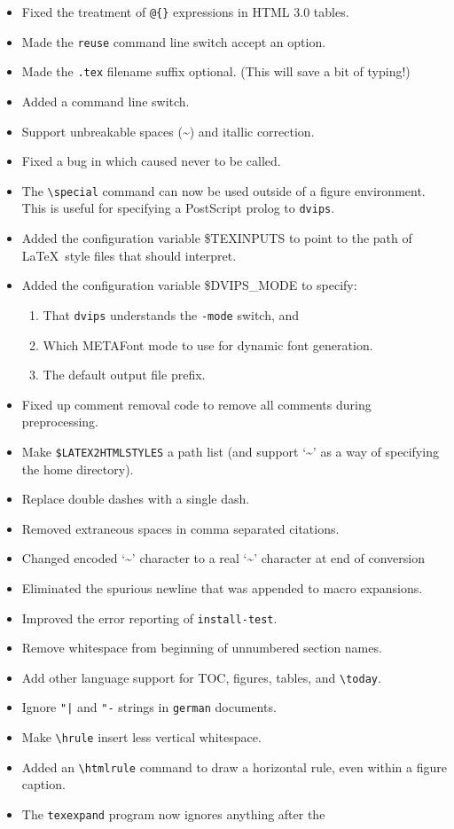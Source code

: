 \begin{htmllist}
\begin{itemize}
\item Fixed the treatment of \verb|@{}| expressions in HTML 3.0 tables.
\item Made the \texttt{reuse} command line switch accept an option.
\item Made the \texttt{.tex} filename suffix optional. (This will
save a bit of typing!)
\item Added a  command line switch.
\item Support unbreakable spaces (\~{}) and itallic correction.
\item Fixed a bug in  which caused  never
to be called.
\item The \verb|\special| 
command can now be used outside
of a figure environment.  This is useful for specifying
a PostScript prolog to \texttt{dvips}.
\item Added the configuration variable \$TEXINPUTS to point
to the path of \LaTeX\ style files that \latextohtml{} should interpret.
\item Added the configuration variable \$DVIPS\_MODE to specify:
\begin{enumerate}
\item That \texttt{dvips} understands the \texttt{-mode} switch, and
\item Which METAFont mode to use for dynamic font generation.
\item The default output file prefix.
\end{enumerate}
\item Fixed up comment removal code to remove all comments during preprocessing.
\item Make \texttt{\$LATEX2HTMLSTYLES} a path list (and support `\~{}' as 
a way of specifying the home directory).
\item Replace double dashes with a single dash.
\item Removed extraneous spaces in comma separated citations.
\item Changed encoded `\~{}' character to a real `\~{}' character at end of conversion
\item Eliminated the spurious newline that was appended to macro
expansions.
\item Improved the error reporting of \texttt{install-test}.
\item Remove whitespace from beginning of unnumbered section names.
\item Add other language support for TOC, figures, tables, and
\verb|\today|.
\item Ignore \verb+"|+ and \verb+"-+ strings in \texttt{german} documents.
\item Make \verb|\hrule| insert less vertical whitespace.
\item Added an \verb|\htmlrule| 
command to draw a horizontal rule, even within a figure caption.
\item The \texttt{texexpand} program now ignores anything after the
\begin{verbatim}


\end{verbatim}
\end{itemize}
\end{htmllist}
